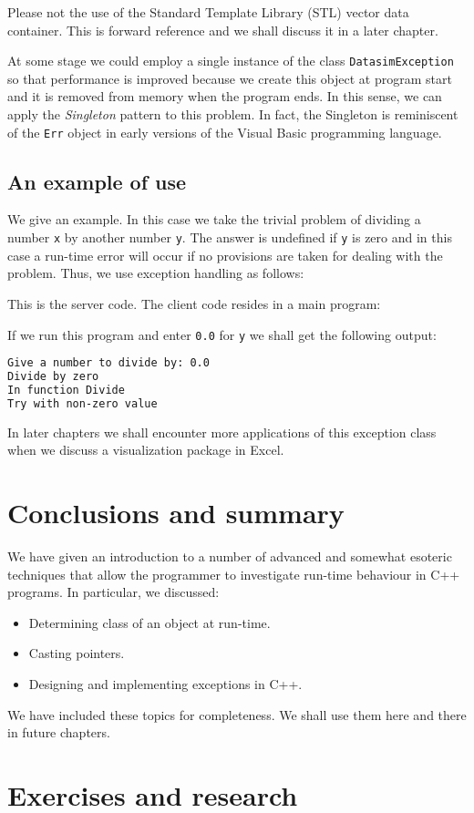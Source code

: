 Please not the use of the Standard Template Library (STL) vector data container. This is forward reference and we shall discuss it in a later chapter.

At some stage we could employ a single instance of the class \texttt{DatasimException} so that performance is improved because we create this object at program start and it is removed from memory when the program ends. In this sense, we can apply the \emph{Singleton} pattern to this problem. In fact, the Singleton is reminiscent of the \texttt{Err} object in early versions of the Visual Basic programming language.

\subsection{An example of use}
We give an example. In this case we take the trivial problem of dividing a number \texttt{x} by another number \texttt{y}. The answer is undefined if \texttt{y} is zero and in this case a run-time error will occur if no provisions are taken for dealing with the problem. Thus, we use exception handling as follows:



This is the server code. The client code resides in a main program:

If we run this program and enter \texttt{0.0} for \texttt{y} we shall get the following output:
\begin{lstlisting}[language=bash]
Give a number to divide by: 0.0
Divide by zero
In function Divide
Try with non-zero value
\end{lstlisting}
In later chapters we shall encounter more applications of this exception class when we discuss a visualization package in Excel.

\section{Conclusions and summary}
We have given an introduction to a number of advanced and somewhat esoteric techniques that allow the programmer to investigate run-time behaviour in C++ programs. In particular, we discussed:
\begin{itemize}
	\item Determining class of an object at run-time.
	\item Casting pointers.
	\item Designing and implementing exceptions in C++.
\end{itemize}
We have included these topics for completeness. We shall use them here and there in future chapters.
\section{Exercises and research}